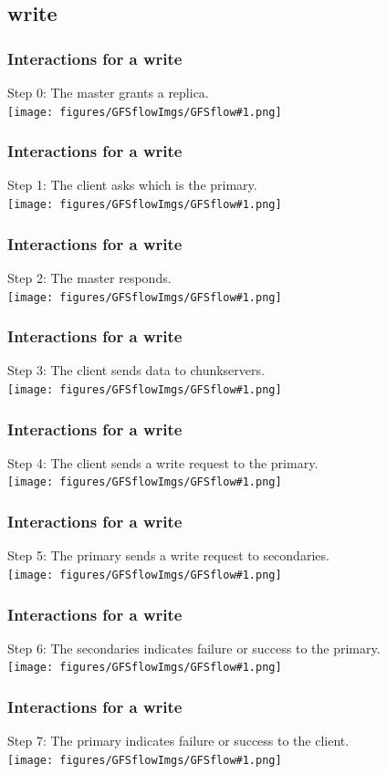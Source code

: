 \documentclass{beamer}
\begin{document}
\newcommand{\writeslide}[2]{\begin{frame}\frametitle{Interactions for a write}\alert{Step #1}: #2\vspace{0.3cm}\\\centering\texttt{[image: figures/GFSflowImgs/GFSflow\#1.png]}\end{frame}}
\subsection{write}
\writeslide{0}{The master grants a replica.}
\writeslide{1}{The client asks which is the primary.}
\writeslide{2}{The master responds.}
\writeslide{3}{The client sends data to chunkservers.}
\writeslide{4}{The client sends a write request to the primary.}
\writeslide{5}{The primary sends a write request to secondaries.}
\writeslide{6}{The secondaries indicates failure or success to the primary.}
\writeslide{7}{The primary indicates failure or success to the client.}

\end{document}
